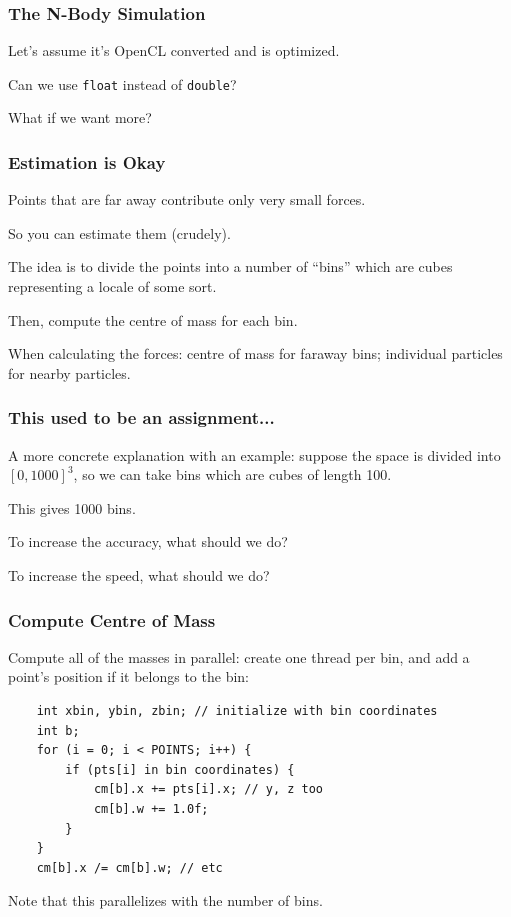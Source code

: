 \begin{frame}
\frametitle{The N-Body Simulation}

Let's assume it's OpenCL converted and is optimized.

Can we use \texttt{float} instead of \texttt{double}?

What if we want more?

\end{frame}


\begin{frame}
\frametitle{Estimation is Okay}

Points that are far away contribute only very small forces. 

So you can estimate them (crudely). 

The idea is to divide the points into a number of ``bins'' which are cubes representing a locale of some sort. 

Then, compute the centre of mass for each bin. 

When calculating the forces: centre of mass for faraway bins; individual particles for nearby particles.


\end{frame}


\begin{frame}
\frametitle{This used to be an assignment... }

A more concrete explanation with an example: suppose the space  is divided into $[0, 1000]^3$, so we can take bins which are cubes of length 100. 

This gives 1000 bins. 

To increase the accuracy, what should we do?

To increase the speed, what should we do?

\end{frame}


\begin{frame}[fragile]
\frametitle{Compute Centre of Mass}

Compute all of the masses in parallel: create one thread per bin, and add a point's
position if it belongs to the bin:

\begin{lstlisting}
    int xbin, ybin, zbin; // initialize with bin coordinates
    int b;
    for (i = 0; i < POINTS; i++) {
        if (pts[i] in bin coordinates) {
            cm[b].x += pts[i].x; // y, z too
            cm[b].w += 1.0f;
        }
    }
    cm[b].x /= cm[b].w; // etc
\end{lstlisting}

Note that this parallelizes with the number of bins.


\end{frame}


